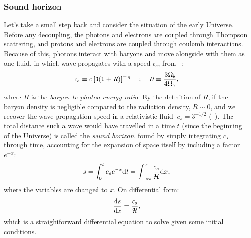 \subsubsection{Sound horizon}
    Let's take a small step back and consider the situation of the early Universe. Before any decoupling, the photons and electrons are coupled through Thompson scattering, and protons and electrons are coupled through coulomb interactions. Because of this, photons interact with baryons and move alongside with them as one fluid, in which wave propagates with a speed $c_s$, from ~\cite{dodelson2020modern}:
    \begin{equation}\label{eq:m2:theory:sound_speed}
        c_s \equiv c\left[3(1+R)\right]^{-\frac{1}{2}} \quad ; \quad R\equiv\frac{3\Omega_b}{4\Omega_\gamma},
    \end{equation}
    where $R$ is the \textit{baryon-to-photon energy ratio}. By the definition of $R$, if the baryon density is negligible compared to the radiation density, $R\sim0$, and we recover the wave propagation speed in a relativistic fluid: $c_s=3^{-1/2}$ (~\cite{dodelson2020modern}). The total distance such a wave would have travelled in a time $t$ (since the beginning of the Universe) is called the \textit{sound horizon}, found by simply integrating $c_s$ through time, accounting for the expansion of space itself by including a factor $e^{-x}$:
    \begin{equation}\label{eq:m2:theory:sound_horizon_def}
        s = \int_0^tc_se^{-x}\mathrm{d} t = \int_{-\infty}^x\frac{c_s}{\mathcal{H}}\mathrm{d} x,
    \end{equation}
    where the variables are changed to $x$. On differential form:
    \begin{equation}\label{eq:m2:theory:sound_horizon_differential}
        \dv{s}{x} = \frac{c_s}{\mathcal{H}},
    \end{equation}
    which is a straightforward differential equation to solve given some initial conditions. 